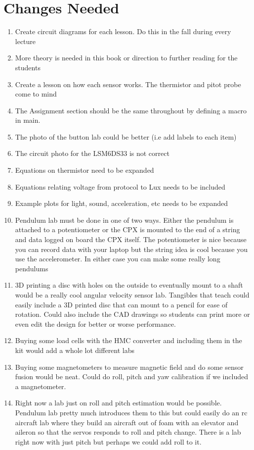 \documentclass{article}
\begin{document}
\section*{Changes Needed}

\begin{enumerate}[itemsep=-5pt]
\item Create circuit diagrams for each lesson. Do this in the fall during every lecture
\item More theory is needed in this book or direction to further
  reading for the students
\item Create a lesson on how each sensor works. The thermistor and pitot probe come to mind 
\item The Assignment section should be the same throughout by defining a macro in main.
\item The photo of the button lab could be better (i.e add labels to
  each item)
\item The circuit photo for the LSM6DS33 is not correct
\item Equations on thermistor need to be expanded
\item Equations relating voltage from protocol to Lux needs to be included
\item Example plots for light, sound, acceleration, etc needs to be expanded
\item Pendulum lab must be done in one of two ways. Either the pendulum is attached to a potentiometer or the CPX is mounted to the end of a string and data logged on board the CPX itself. The potentiometer is nice because you can record data with your laptop but the string idea is cool because you use the accelerometer. In either case you can make some really long pendulums
\item 3D printing a disc with holes on the outside to eventually mount to a shaft would be a really cool angular velocity sensor lab. Tangibles that teach could easily include a 3D printed disc that can mount to a pencil for ease of rotation. Could also include the CAD drawings so students can print more or even edit the design for better or worse performance.
\item Buying some load cells with the HMC converter and including them in the kit would add a whole lot different labs
\item Buying some magnetometers to measure magnetic field and do some sensor fusion would be neat. Could do roll, pitch and yaw calibration if we included a magnetometer.
\item Right now a lab just on roll and pitch estimation would be possible. Pendulum lab pretty much introduces them to this but could easily do an rc aircraft lab where they build an aircraft out of foam with an elevator and aileron so that the servos responds to roll and pitch change. There is a lab right now with just pitch but perhaps we could add roll to it.

\end{enumerate}
\end{document}
